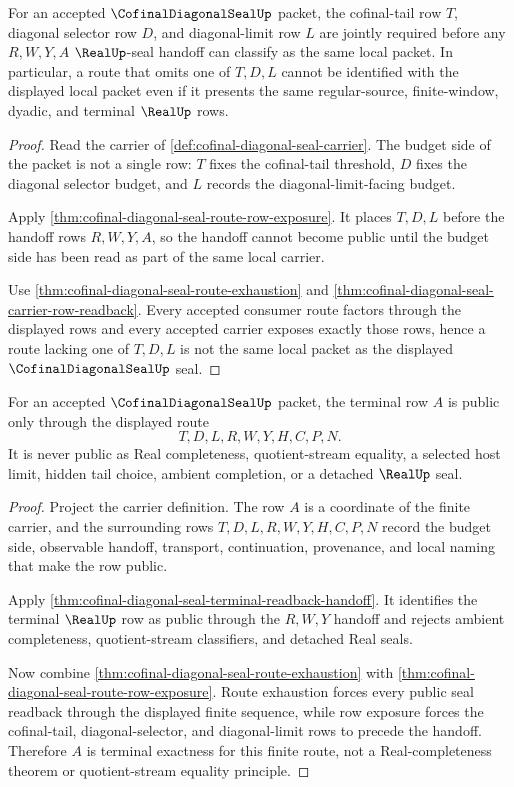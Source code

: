 \begin{theorem}
\label{thm:cofinal-diagonal-seal-cofinal-budget-compatibility}
For an accepted $\CofinalDiagonalSealUp$ packet, the cofinal-tail row $T$, diagonal selector row $D$, and diagonal-limit row $L$ are jointly required before any $R,W,Y,A$ $\RealUp$-seal handoff can classify as the same local packet. In particular, a route that omits one of $T,D,L$ cannot be identified with the displayed local packet even if it presents the same regular-source, finite-window, dyadic, and terminal $\RealUp$ rows.
\end{theorem}
\begin{proof}
Read the carrier of \autoref{def:cofinal-diagonal-seal-carrier}. The budget side of the packet is not a single row: $T$ fixes the cofinal-tail threshold, $D$ fixes the diagonal selector budget, and $L$ records the diagonal-limit-facing budget.

Apply \autoref{thm:cofinal-diagonal-seal-route-row-exposure}. It places $T,D,L$ before the handoff rows $R,W,Y,A$, so the handoff cannot become public until the budget side has been read as part of the same local carrier.

Use \autoref{thm:cofinal-diagonal-seal-route-exhaustion} and \autoref{thm:cofinal-diagonal-seal-carrier-row-readback}. Every accepted consumer route factors through the displayed rows and every accepted carrier exposes exactly those rows, hence a route lacking one of $T,D,L$ is not the same local packet as the displayed $\CofinalDiagonalSealUp$ seal.
\end{proof}

\begin{theorem}
\label{thm:cofinal-diagonal-seal-terminal-exactness}
For an accepted $\CofinalDiagonalSealUp$ packet, the terminal row $A$ is public only through the displayed route
$$
T,D,L,R,W,Y,H,C,P,N.
$$
It is never public as Real completeness, quotient-stream equality, a selected host limit, hidden tail choice, ambient completion, or a detached $\RealUp$ seal.
\end{theorem}
\begin{proof}
Project the carrier definition. The row $A$ is a coordinate of the finite carrier, and the surrounding rows $T,D,L,R,W,Y,H,C,P,N$ record the budget side, observable handoff, transport, continuation, provenance, and local naming that make the row public.

Apply \autoref{thm:cofinal-diagonal-seal-terminal-readback-handoff}. It identifies the terminal $\RealUp$ row as public through the $R,W,Y$ handoff and rejects ambient completeness, quotient-stream classifiers, and detached Real seals.

Now combine \autoref{thm:cofinal-diagonal-seal-route-exhaustion} with \autoref{thm:cofinal-diagonal-seal-route-row-exposure}. Route exhaustion forces every public seal readback through the displayed finite sequence, while row exposure forces the cofinal-tail, diagonal-selector, and diagonal-limit rows to precede the handoff. Therefore $A$ is terminal exactness for this finite route, not a Real-completeness theorem or quotient-stream equality principle.
\end{proof}

